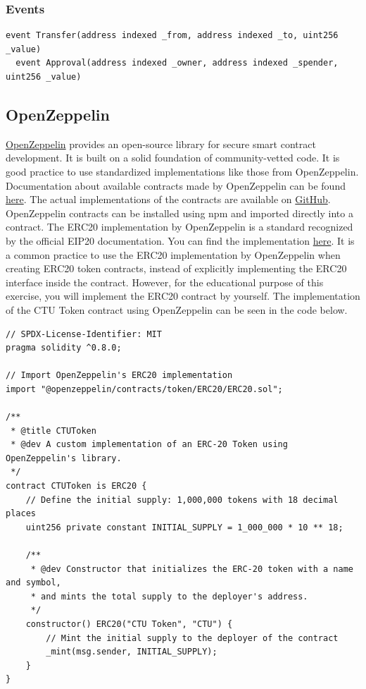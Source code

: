 \documentclass[12pt]{article}
\begin{document}
\subsubsection*{Events}

\begin{lstlisting}[language=Solidity]
  event Transfer(address indexed _from, address indexed _to, uint256 _value)
  event Approval(address indexed _owner, address indexed _spender, uint256 _value)  
\end{lstlisting}

\subsection*{OpenZeppelin}

\href{https://www.openzeppelin.com/}{OpenZeppelin} provides an open-source library for secure smart contract development. It is built on a solid
foundation of community-vetted code. It is good practice to use standardized implementations like those from OpenZeppelin. Documentation about available contracts made by OpenZeppelin can be found \href{https://docs.openzeppelin.com/contracts/4.x/}{here}. The actual implementations of the contracts are available on \href{https://github.com/OpenZeppelin/openzeppelin-contracts}{GitHub}. OpenZeppelin contracts can be installed using npm and imported directly into a contract. The ERC20 implementation by OpenZeppelin is a standard recognized by the official EIP20 documentation. You can find the implementation \href{https://github.com/OpenZeppelin/openzeppelin-contracts/blob/master/contracts/token/ERC20/ERC20.sol}{here}. It is a common practice to use the ERC20 implementation by OpenZeppelin when creating ERC20 token contracts, instead of explicitly implementing the ERC20 interface inside the contract. However, for the educational purpose of this exercise, you will implement the ERC20 contract by yourself. The implementation of the CTU Token contract using OpenZeppelin can be seen in the code below.

\noindent
\begin{minipage}{\textwidth}
\begin{lstlisting}[language=Solidity]
// SPDX-License-Identifier: MIT
pragma solidity ^0.8.0;

// Import OpenZeppelin's ERC20 implementation
import "@openzeppelin/contracts/token/ERC20/ERC20.sol";

/**
 * @title CTUToken
 * @dev A custom implementation of an ERC-20 Token using OpenZeppelin's library.
 */
contract CTUToken is ERC20 {
    // Define the initial supply: 1,000,000 tokens with 18 decimal places
    uint256 private constant INITIAL_SUPPLY = 1_000_000 * 10 ** 18;

    /**
     * @dev Constructor that initializes the ERC-20 token with a name and symbol,
     * and mints the total supply to the deployer's address.
     */
    constructor() ERC20("CTU Token", "CTU") {
        // Mint the initial supply to the deployer of the contract
        _mint(msg.sender, INITIAL_SUPPLY);
    }
}
\end{lstlisting}
\end{minipage}
\end{document}
